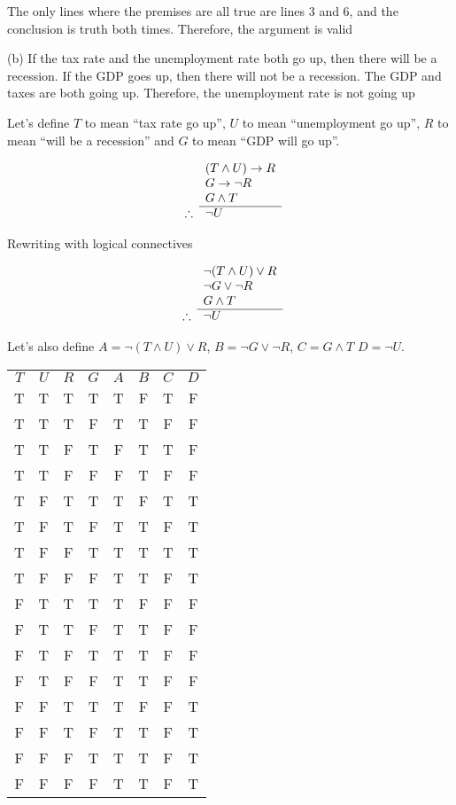 \documentclass[11pt]{article}
\newcommand{\then}{\rightarrow}
\begin{document}
The only lines where the premises are all true are lines 3 and 6, and the 
conclusion is truth both times. Therefore, the argument is valid

\noindent (b) If the tax rate and the unemployment rate both go up, then there 
will be a recession. If the GDP goes up, then there will not be a recession. The 
GDP and taxes are both going up. Therefore, the unemployment rate is not going up 

Let's define $T$ to mean ``tax rate go up'', $U$ to mean ``unemployment go up'',
$R$ to mean ``will be a recession'' and $G$ to mean ``GDP will go up''.

\[
  \begin{array}{ r l }
               & (T \wedge U) \then R \\
               & G \then \neg R \\
               & G \wedge T\\
    \cline{2-2}
    \therefore & \neg U
  \end{array}
\]

Rewriting with logical connectives 

\[
  \begin{array}{ r l }
               & \neg (T \wedge U) \vee R \\
               & \neg G \vee \neg R \\
               & G \wedge T\\
    \cline{2-2}
    \therefore & \neg U
  \end{array}
\]

Let's also define
$A = \neg (T \wedge U) \vee R$,
$B = \neg G \vee \neg R$,
$C = G \wedge T$
$D = \neg U$.

\begin{center}
\begin{tabular}{ c c c c c c c c }
$T$ & $U$ & $R$ & $G$ & $A$ & $B$ & $C$ & $D$\\
T & T & T & T & T & F & T & F\\
T & T & T & F & T & T & F & F\\
T & T & F & T & F & T & T & F\\
T & T & F & F & F & T & F & F\\
T & F & T & T & T & F & T & T\\
T & F & T & F & T & T & F & T\\
T & F & F & T & T & T & T & T\\
T & F & F & F & T & T & F & T\\
F & T & T & T & T & F & F & F\\
F & T & T & F & T & T & F & F\\
F & T & F & T & T & T & F & F\\
F & T & F & F & T & T & F & F\\
F & F & T & T & T & F & F & T\\
F & F & T & F & T & T & F & T\\
F & F & F & T & T & T & F & T\\
F & F & F & F & T & T & F & T\\
\end{tabular}
\end{center}
\end{document}
